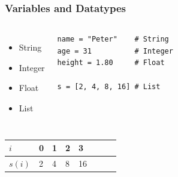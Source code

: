 \documentclass{beamer}
\begin{document}
\begin{frame}[fragile]

    \frametitle{Variables and Datatypes}

    \begin{columns}[t]


            \begin{itemize}
                \item String
                \item Integer
                \item Float
                \item List
            \end{itemize}


\begin{lstlisting}
name = "Peter"    # String
age = 31          # Integer
height = 1.80     # Float

s = [2, 4, 8, 16] # List
\end{lstlisting}

    \end{columns}

    \bigskip

    \centering

\begin{tabular}{llllllll}
   $i$  & 0  & 1 & 2 & 3 \\ \hline
$s(i)$ & 2 & 4 & 8 & 16  
\end{tabular}



\end{frame}
\end{document}
